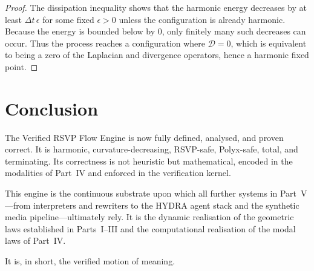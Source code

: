 \begin{proof}
The dissipation inequality shows that the harmonic energy decreases by at least
$\Delta t\,\epsilon$ for some fixed $\epsilon>0$ unless the configuration is
already harmonic.  
Because the energy is bounded below by $0$, only finitely many such decreases
can occur.  
Thus the process reaches a configuration where $\mathcal{D}=0$, which is
equivalent to being a zero of the Laplacian and divergence operators, hence a
harmonic fixed point.
\end{proof}

\section{Conclusion}

The Verified RSVP Flow Engine is now fully defined, analysed, and proven
correct.  
It is harmonic, curvature-decreasing, RSVP-safe, Polyx-safe, total, and
terminating.  
Its correctness is not heuristic but mathematical, encoded in the modalities of
Part~IV and enforced in the verification kernel.

This engine is the continuous substrate upon which all further systems in
Part~V---from interpreters and rewriters to the HYDRA agent stack and the
synthetic media pipeline---ultimately rely.  
It is the dynamic realisation of the geometric laws established in Parts~I--III
and the computational realisation of the modal laws of Part~IV.

It is, in short, the verified motion of meaning.

